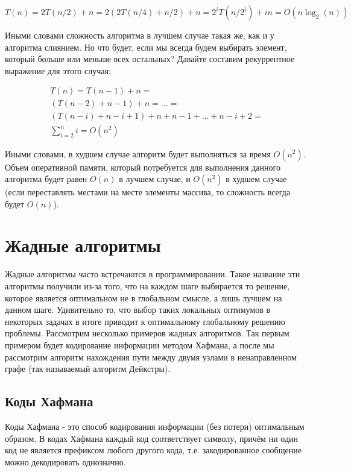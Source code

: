 $$T(n) = 2T(n/2) + n = 2(2T(n/4) + n/2) + n = 2^iT(n/2^i) + in = O(n\log_2(n))$$

Иными словами сложность алгоритма в лучшем случае такая же, как и у алгоритма слиянием.
Но что будет, если мы всегда будем выбирать элемент, который больше или меньше всех остальных?
Давайте составим рекуррентное выражение для этого случая:

\begin{equation*}
\begin{multlined}
T(n) = T(n-1) + n =  \\
(T(n-2) + n - 1) + n = \ldots = \\
(T(n-i) + n - i + 1) + n + n - 1 + \ldots + n - i + 2 = \\
\sum_{i=2}^n i = O(n^2)
\end{multlined}
\end{equation*}

Иными словами, в худшем случае алгоритм будет выполняться за время $O(n^2)$.
Объем оперативной памяти, который потребуется для выполнения данного алгоритма 
будет равен $O(n)$ в лучшем случае, и $O(n^2)$ в худшем случае (если переставлять
местами на месте элементы массива, то сложность всегда будет $O(n)$).

\section{Жадные алгоритмы}

Жадные алгоритмы часто встречаются в программировании. 
Такое название эти алгоритмы получили из-за того, что на каждом
шаге выбирается то решение, которое является оптимальном не в 
глобальном смысле, а лишь лучшем на данном шаге. Удивительно то, 
что выбор таких локальных оптимумов в некоторых задачах в итоге приводит к оптимальному 
глобальному решению проблемы. Рассмотрим несколько примеров жадных 
алгоритмов. Так первым примером будет кодирование информации методом 
Хафмана, а после мы рассмотрим алгоритм нахождения  
пути между двумя узлами в ненаправленном графе (так называемый 
алгоритм Дейкстры).

\subsection{Коды Хафмана}

Коды Хафмана - это способ кодирования информации (без потери) 
оптимальным образом. В кодах Хафмана каждый код соответствует
символу, причём ни один код не является префиксом любого другого 
кода, т.е. закодированное сообщение можно декодировать однозначно.

